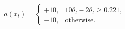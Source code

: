 \[
  a(x_t) =
  \begin{cases}
    +10, & 10\theta_t - 2\dot{\theta}_t \ge 0.221,\\
    -10, & \text{otherwise}.
  \end{cases}
\]
